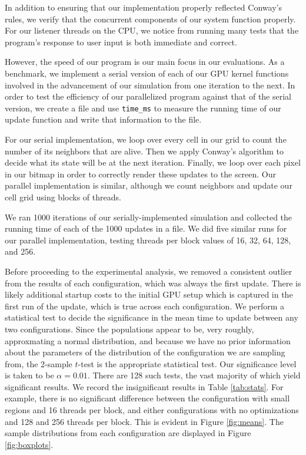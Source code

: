 \documentclass[12pt]{article}
\begin{document}
    In addition to ensuring that our implementation properly reflected Conway's rules, we verify that the concurrent components of our system function properly. For our listener threads on the CPU, we notice from running many tests that the program's response to user input is both immediate and correct. 
    
    However, the speed of our program is our main focus in our evaluations. As a benchmark, we implement a serial version of each of our GPU kernel functions involved in the advancement of our simulation from one iteration to the next. In order to test the efficiency of our parallelized program against that of the serial version, we create a file and use \texttt{time\_ms} to measure the running time of our update function and write that information to the file. 
    
    For our serial implementation, we loop over every cell in our grid to count the number of its neighbors that are alive. Then we apply Conway's algorithm to decide what its state will be at the next iteration. Finally, we loop over each pixel in our bitmap in order to correctly render these updates to the screen. Our parallel implementation is similar, although we count neighbors and update our cell grid using blocks of threads. 

    We ran 1000 iterations of our serially-implemented simulation and collected the running time of each of the 1000 updates in a file. We did five similar runs for our parallel implementation, testing threads per block values of 16, 32, 64, 128, and 256.

    Before proceeding to the experimental analysis, we removed a consistent
    outlier from the results of each configuration, which was always the first
    update. There is likely additional startup costs to the initial GPU setup
    which is captured in the first run of the update, which is true across each
    configuration. We perform a statistical test to decide the significance in
    the mean time to update between any two configurations. Since the
    populations appear to be, very roughly, approxmating a normal distribution,
    and because we have no prior information about the parameters of the
    distribution of the configuration we are sampling from, the 2-sample
    $t$-test is the appropriate statistical test. Our significance level is
    taken to be $\alpha = 0.01$. There are 128 such tests, the vast majority of
    which yield significant results. We record the insignificant results in
    Table \ref{tab:stats}. For example, there is no significant difference
    between the configuration with small regions and 16 threads per block, and
    either configurations with no optimizations and 128 and 256 threads per
    block.  This is evident in Figure \ref{fig:means}. The sample distributions
    from each configuration are displayed in Figure \ref{fig:boxplots}.
\end{document}
